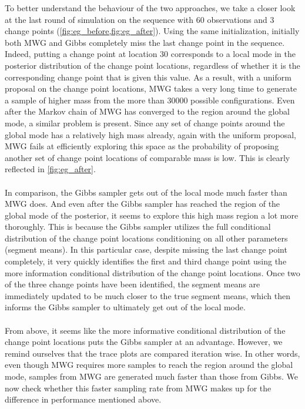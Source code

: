 To better understand the behaviour of the two approaches, we take a closer look at the last round of simulation on the sequence with $60$ observations and $3$ change points (\cref{fig:eg_before,fig:eg_after}). Using the same initialization, initially both MWG and Gibbs completely miss the last change point in the sequence. Indeed, putting a change point at location $30$ corresponds to a local mode in the posterior distribution of the change point locations, regardless of whether it is the corresponding change point that is given this value. As a result, with a uniform proposal on the change point locations, MWG takes a very long time to generate a sample of higher mass from the more than $30000$ possible configurations. Even after the Markov chain of MWG has converged to the region around the global mode, a similar problem is present. Since any set of change points around the global mode has a relatively high mass already, again with the uniform proposal, MWG fails at efficiently exploring this space as the probability of proposing another set of change point locations of comparable mass is low. This is clearly reflected in \cref{fig:eg_after}.\\\\
In comparison, the Gibbs sampler gets out of the local mode much faster than MWG does. And even after the Gibbs sampler has reached the region of the global mode of the posterior, it seems to explore this high mass region a lot more thoroughly. This is because the Gibbs sampler utilizes the full conditional distribution of the change point locations conditioning on all other parameters (segment means). In this particular case, despite missing the last change point completely, it very quickly identifies the first and third change point using the more information conditional distribution of the change point locations. Once two of the three change points have been identified, the segment means are immediately updated to be much closer to the true segment means, which then informs the Gibbs sampler to ultimately get out of the local mode.\\\\
From above, it seems like the more informative conditional distribution of the change point locations puts the Gibbs sampler at an advantage. However, we remind ourselves that the trace plots are compared iteration wise. In other words, even though MWG requires more samples to reach the region around the global mode, samples from MWG are generated much faster than those from Gibbs. We now check whether this faster sampling rate from MWG makes up for the difference in performance mentioned above.\\\\
